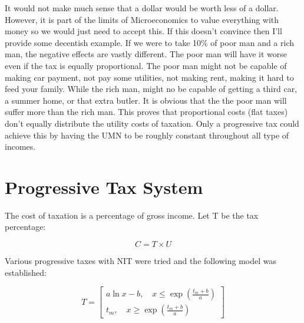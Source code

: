 \documentclass[12pt,letterpaper]{article}
\begin{document}
		It would not make much sense that a dollar would be worth less of a dollar. However, it is part of the limits of Microeconomics to value everything with money so we would just need to accept this. If this doesn't convince then I'll provide some decentish example. If we were to take 10\% of poor man and a rich man, the negative effects are vastly different. The poor man will have it worse even if the tax is equally proportional. The poor man might not be capable of making car payment, not pay some utilities, not making rent, making it hard to feed your family. While the rich man, might no be capable of getting a third car, a summer home, or that extra butler. It is obvious that the the poor man will suffer more than the rich man. This proves that proportional costs (flat taxes) don't equally distribute the utility costs of taxation. Only a progressive tax could achieve this by having the UMN to be roughly constant throughout all type of incomes.

		\section{Progressive Tax System}

		The cost of taxation is a percentage of gross income. Let T be the tax percentage:

		\begin{equation}
			C = T \times U
		\end{equation}

		Various progressive taxes with NIT were tried and the following model was established:


		\begin{equation}
			T = \begin{bmatrix}
				a \ln x-b, \quad x \leq \exp(\frac{t_m+b}{a}) \\
				t_m, \quad x \geq \exp(\frac{t_m+b}{a})
			\end{bmatrix}
		\end{equation}

\end{document}
